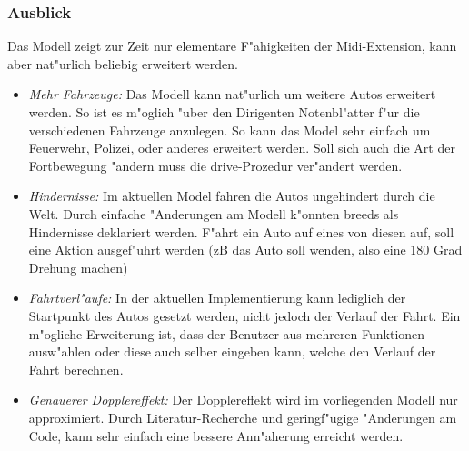 \subsubsection{Ausblick}
Das Modell zeigt zur Zeit nur elementare F"ahigkeiten der Midi-Extension, kann
aber nat"urlich beliebig erweitert werden. 
\begin{itemize}
\item \emph{Mehr Fahrzeuge: }
Das Modell kann nat"urlich um weitere Autos erweitert werden. So ist es 
m"oglich "uber den Dirigenten Notenbl"atter f"ur die verschiedenen Fahrzeuge
anzulegen. So kann das Model sehr einfach um Feuerwehr, Polizei, oder anderes
erweitert werden. Soll sich auch die Art der Fortbewegung "andern muss die 
drive-Prozedur ver"andert werden. 
\item \emph{Hindernisse: }
Im aktuellen Model fahren die Autos ungehindert durch die Welt. Durch einfache
"Anderungen am Modell k"onnten breeds als Hindernisse deklariert werden. F"ahrt
ein Auto auf eines von diesen auf, soll eine Aktion ausgef"uhrt werden (zB das
Auto soll wenden, also eine 180 Grad Drehung machen)
\item \emph{Fahrtverl"aufe: } 
In der aktuellen Implementierung kann lediglich der Startpunkt des Autos gesetzt
werden, nicht jedoch der Verlauf der Fahrt. Ein m"ogliche Erweiterung ist, dass
der Benutzer aus mehreren Funktionen ausw"ahlen oder diese auch selber eingeben 
kann, welche den Verlauf der Fahrt berechnen.
\item \emph{Genauerer Dopplereffekt: }
Der Dopplereffekt wird im vorliegenden Modell nur approximiert. Durch Literatur-Recherche und 
geringf"ugige "Anderungen am Code, kann sehr einfach eine bessere Ann"aherung
erreicht werden. 
\end{itemize}

